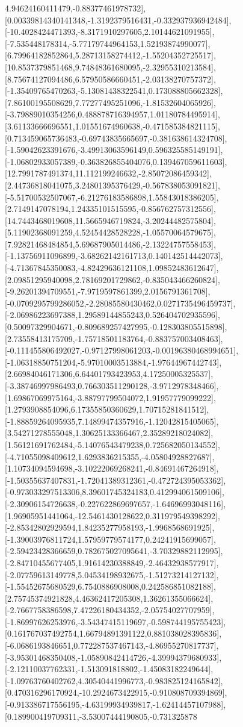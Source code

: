 \documentclass{article}
\begin{document}
4.94624160411479,-0.88377461978732],[0.00339814340141348,-1.3192379516431,-0.332937936942484],[-10.4028424471393,-8.3171910297605,2.10144621091955],[-7.535448178314,-5.77179744964153,1.52193874990077],[6.79964182852864,5.28713158274412,-1.55204352725517],[10.8537379851468,9.74848361680095,-2.32955310213584],[8.75674127094486,6.57950586660451,-2.03138270757372],[-1.35409765470263,-5.13081438322541,0.173088805662328],[7.86100195508629,7.77277495251096,-1.81532604065926],[-3.79889010354256,0.488878716394957,1.01180784495914],[3.61133666696551,1.01551674960638,-0.471585384821115],[0.713459065736483,-0.69743835665697,-0.381638614324708],[-1.59042623391676,-3.49913063596149,0.596325585149191],[-1.06802933057389,-0.363826855404076,0.139467059611603],[12.7991787491374,11.112199246632,-2.85072086459342],[2.44736818041075,3.24801395376429,-0.567838053091821],[-5.51700532507067,-6.21276183586898,1.55843018386205],[2.7149147078194,1.24335101515595,-0.856762757312556],[14.7443468019608,11.5665946719824,-3.20244482575804],[5.11902368091259,4.52454428528228,-1.05570064579675],[7.92821468484854,5.69687905014486,-2.13224757558453],[-1.13756911096899,-3.68262142161713,0.140142514442073],[-4.71367845350083,-4.82429636121108,1.09852483612647],[2.09851295940098,2.78169201729862,-0.835043466260824],[-9.26201394709551,-7.9719597861399,2.0156791361708],[-0.0709295799286052,-2.28085580430462,0.0271735496459737],[-2.06986223697388,1.29589144855243,0.526404702935596],[0.50097329904671,-0.809689257427995,-0.128303805515898],[2.73558413175709,-1.75718501183764,-0.883757003408463],[-0.111455806492027,-0.97127998061203,-0.00196380468994651],[-1.06318850751204,-5.97010003513884,-1.97644967442743],[2.66984046171306,6.64401793423953,4.17250005325537],[-3.38746997986493,0.766303511290128,-3.9712978348466],[1.69867069975164,-3.88797799504072,1.91957779099222],[1.2793908854096,6.17355850360629,1.70715281841512],[-1.88859264095935,7.14899474357916,-1.12042815405065],[3.54271278555048,1.30625133366467,2.35289218024082],[1.56121691762484,-5.14076543479238,0.725682050134552],[-4.71055098409612,1.6293836215355,-4.05804928827687],[1.10734094594698,-3.10222069268241,-0.84691467264918],[-1.50355637407831,-1.72041389312361,-0.472724395053362],[-0.973033297513306,8.39601745324183,0.412994061509106],[-2.30906154726638,-0.227622869697657,-1.64696993048116],[1.96905951441064,-12.5461430128622,0.311979549398292],[-2.85342802929594,1.84235277958193,-1.9968568691925],[-1.39003976811724,1.57959779574177,0.24241915699057],[-2.59423428366659,0.782675027095641,-3.70329882112995],[-2.84710455677405,1.91614230388849,-2.46432938577917],[-2.07759613149778,5.04534198932675,-1.51273214127132],[-1.55452675680529,6.7540886908008,0.242586851082188],[2.75745374921828,4.46362417205308,1.36261355066624],[-2.7667758386598,7.47226180434352,-2.05754027707959],[-1.86997626253976,-3.54347415119697,-0.598744195755423],[0.161767037492754,1.66794891391122,0.881038028395836],[-6.0686193846651,0.772287537467143,-4.86955270817737],[-3.95301468350408,-1.05890842414726,-4.39994379680933],[-2.12110037762331,-1.513091818802,-1.45083182249644],[-1.09763760402762,4.30540441996773,-0.983825124165842],[0.470316296170924,-10.2924673422915,-0.910808709394869],[-0.913386717556195,-4.63199934939817,-1.62414457107988],[0.189900419709311,-3.53007444190805,-0.731325878
\end{document}
